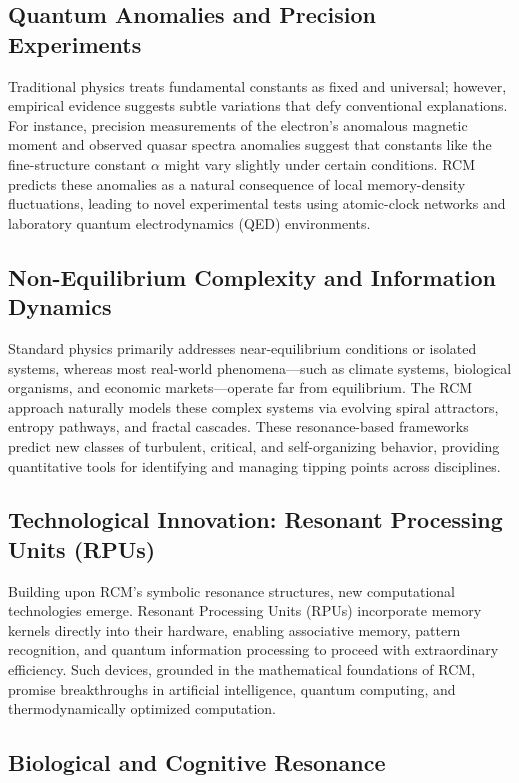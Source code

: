 \subsection{Quantum Anomalies and Precision Experiments}

Traditional physics treats fundamental constants as fixed and universal; however, empirical evidence suggests subtle variations that defy conventional explanations. For instance, precision measurements of the electron’s anomalous magnetic moment and observed quasar spectra anomalies suggest that constants like the fine-structure constant $\alpha$ might vary slightly under certain conditions. RCM predicts these anomalies as a natural consequence of local memory-density fluctuations, leading to novel experimental tests using atomic-clock networks and laboratory quantum electrodynamics (QED) environments.

\subsection{Non-Equilibrium Complexity and Information Dynamics}

Standard physics primarily addresses near-equilibrium conditions or isolated systems, whereas most real-world phenomena—such as climate systems, biological organisms, and economic markets—operate far from equilibrium. The RCM approach naturally models these complex systems via evolving spiral attractors, entropy pathways, and fractal cascades. These resonance-based frameworks predict new classes of turbulent, critical, and self-organizing behavior, providing quantitative tools for identifying and managing tipping points across disciplines.

\subsection{Technological Innovation: Resonant Processing Units (RPUs)}

Building upon RCM’s symbolic resonance structures, new computational technologies emerge. Resonant Processing Units (RPUs) incorporate memory kernels directly into their hardware, enabling associative memory, pattern recognition, and quantum information processing to proceed with extraordinary efficiency. Such devices, grounded in the mathematical foundations of RCM, promise breakthroughs in artificial intelligence, quantum computing, and thermodynamically optimized computation.

\subsection{Biological and Cognitive Resonance}

